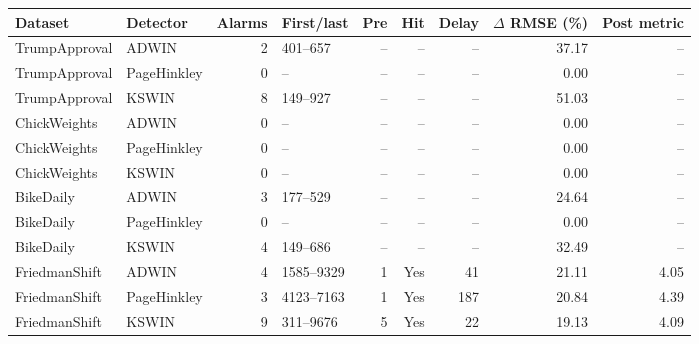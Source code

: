 \begin{tabular}{llrlrrrrr}
\toprule
Dataset & Detector & Alarms & First/last & Pre & Hit & Delay & $\Delta$ RMSE (\%) & Post metric \\
\midrule
TrumpApproval & ADWIN & 2 & 401--657 & -- & -- & -- & 37.17 & -- \\
TrumpApproval & PageHinkley & 0 & -- & -- & -- & -- & 0.00 & -- \\
TrumpApproval & KSWIN & 8 & 149--927 & -- & -- & -- & 51.03 & -- \\
ChickWeights & ADWIN & 0 & -- & -- & -- & -- & 0.00 & -- \\
ChickWeights & PageHinkley & 0 & -- & -- & -- & -- & 0.00 & -- \\
ChickWeights & KSWIN & 0 & -- & -- & -- & -- & 0.00 & -- \\
BikeDaily & ADWIN & 3 & 177--529 & -- & -- & -- & 24.64 & -- \\
BikeDaily & PageHinkley & 0 & -- & -- & -- & -- & 0.00 & -- \\
BikeDaily & KSWIN & 4 & 149--686 & -- & -- & -- & 32.49 & -- \\
FriedmanShift & ADWIN & 4 & 1585--9329 & 1 & Yes & 41 & 21.11 & 4.05 \\
FriedmanShift & PageHinkley & 3 & 4123--7163 & 1 & Yes & 187 & 20.84 & 4.39 \\
FriedmanShift & KSWIN & 9 & 311--9676 & 5 & Yes & 22 & 19.13 & 4.09 \\
\bottomrule
\end{tabular}

